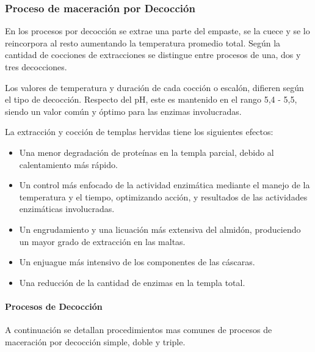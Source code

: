             \subsubsection{Proceso de maceración por Decocción}
                \par En los procesos por decocción se extrae una parte del empaste, se la cuece y se lo reincorpora al resto aumentando la temperatura promedio total. Según la cantidad de cocciones de extracciones se distingue entre procesos de una, dos y tres decocciones.
            
                \par Los valores de temperatura y duración de cada cocción o escalón, difieren según el tipo de decocción. Respecto del pH, este es mantenido en el rango 5,4 - 5,5, siendo un valor común y óptimo para las enzimas involucradas.
                
                \par La extracción y cocción de templas hervidas tiene los siguientes efectos:
                
                \begin{itemize}
                    \item Una menor degradación de proteínas en la templa parcial, debido al calentamiento más rápido.
                    
                    \item Un control más enfocado de la actividad enzimática mediante el manejo de la temperatura y el tiempo, optimizando acción, y resultados de las actividades enzimáticas involucradas.
                    
                    \item Un engrudamiento y una licuación más extensiva del almidón, produciendo un mayor grado de extracción en las maltas.
                    
                    \item Un enjuague más intensivo de los componentes de las cáscaras.
                    
                    \item Una reducción de la cantidad de enzimas en la templa total.
                \end{itemize}
                
                \paragraph{Procesos de Decocción} A continuación se detallan procedimientos mas comunes de procesos de maceración por decocción simple, doble y triple.
                

